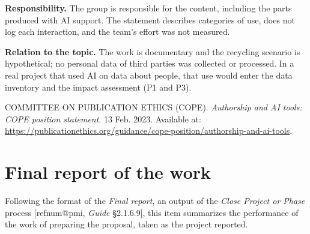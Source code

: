 \documentclass[11pt,a4paper]{article}
\makeatletter
\newcommand{\refnum}[1]{\csname refnum@#1\endcsname}
\makeatother
\begin{document}
\textbf{Responsibility.} The group is responsible for the content, including the parts produced with AI support. The statement describes categories of use, does not log each interaction, and the team's effort was not measured.

\textbf{Relation to the topic.} The work is documentary and the recycling scenario is hypothetical; no personal data of third parties was collected or processed. In a real project that used AI on data about people, that use would enter the data inventory and the impact assessment (P1 and P3).

\begingroup\small\noindent COMMITTEE ON PUBLICATION ETHICS (COPE). \textit{Authorship and AI tools: COPE position statement}. 13 Feb. 2023. Available at: \url{https://publicationethics.org/guidance/cope-position/authorship-and-ai-tools}.\par\endgroup
\fi

\section{Final report of the work}

Following the format of the \textit{Final report}, an output of the \textit{Close Project or Phase} process [\refnum{pmi}, \textit{Guide} §2.1.6.9], this item summarizes the performance of the work of preparing the proposal, taken as the project reported.
\end{document}
